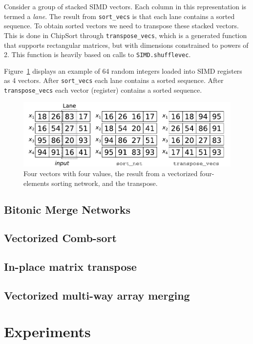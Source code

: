 \documentclass{juliacon}
\begin{document}
Consider a group of stacked SIMD vectors. Each column in this representation is termed a {\em lane}. The result from {\tt sort\_vecs} is that each lane contains a sorted sequence. To obtain sorted vectors we need to transpose these stacked vectors. This is done in ChipSort through {\tt transpose\_vecs}, which is a generated function that supports rectangular matrices, but with dimensions constrained to powers of 2. This function is heavily based on calls to {\tt SIMD.shufflevec}.

Figure~\ref{fig:transpose-vecs} displays an example of 64 random integers loaded into SIMD registers as 4 vectors. After {\tt sort\_vecs} each lane contains a sorted sequence. After {\tt transpose\_vecs} each vector (register) contains a sorted sequence.

\begin{figure}[htb]
\centerline{\includegraphics[width=0.99\linewidth]{fig/regs.pdf}}
\caption{Four vectors with four values, the result from a vectorized four-elements sorting network, and the transpose.}
\label{fig:transpose-vecs}
\end{figure}

\subsection{Bitonic Merge Networks}
%
\subsection{Vectorized Comb-sort}
%
\subsection{In-place matrix transpose}
%
\subsection{Vectorized multi-way array merging}
%

\section{Experiments}
\label{sec:experiments}
%
\end{document}
